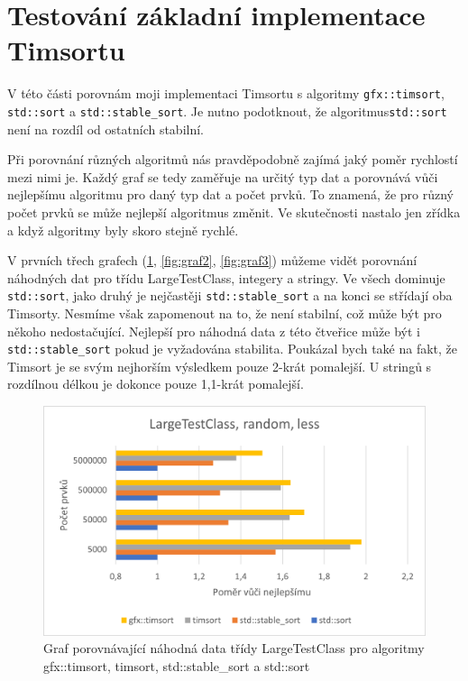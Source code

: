 \documentclass[thesis=B,czech]{FITthesis}[2019/12/23]
\begin{document}
\section{Testování základní implementace Timsortu}
V této části porovnám moji implementaci Timsortu s algoritmy \texttt{gfx::timsort}, \texttt{std::sort} a \texttt{std::stable\_sort}. Je nutno podotknout, že algoritmus\linebreak \texttt{std::sort} není na rozdíl od ostatních stabilní.

Při porovnání různých algoritmů nás pravděpodobně zajímá jaký poměr rychlostí mezi nimi je. Každý graf se tedy zaměřuje na určitý typ dat a porovnává vůči nejlepšímu algoritmu pro daný typ dat a počet prvků. To znamená, že pro různý počet prvků se může nejlepší algoritmus změnit. Ve skutečnosti nastalo jen zřídka a když algoritmy byly skoro stejně rychlé.

V prvních třech grafech (\ref{fig:graf1}, \ref{fig:graf2}, \ref{fig:graf3}) můžeme vidět porovnání náhodných dat pro třídu LargeTestClass, integery a stringy. Ve všech dominuje \texttt{std::sort}, jako druhý je nejčastěji \texttt{std::stable\_sort} a na konci se střídají oba Timsorty. Nesmíme však zapomenout na to, že není stabilní, což může být pro někoho nedostačující. Nejlepší pro náhodná data z této čtveřice může být i \texttt{std::stable\_sort} pokud je vyžadována stabilita. Poukázal bych také na fakt, že Timsort je se svým nejhorším výsledkem pouze 2-krát pomalejší. U stringů s rozdílnou délkou je dokonce pouze 1,1-krát pomalejší. 
\FloatBarrier

\begin{figure}[htbp]\centering
	\includegraphics{obrazky/graf1.png}
	\caption[Graf porovnávající náhodná data třídy LargeTestClass pro algoritmy gfx::timsort, timsort, std::stable\_sort a std::sort]{Graf porovnávající náhodná data třídy LargeTestClass pro algoritmy gfx::timsort, timsort, std::stable\_sort a std::sort}\label{fig:graf1}
\end{figure}
\end{document}
